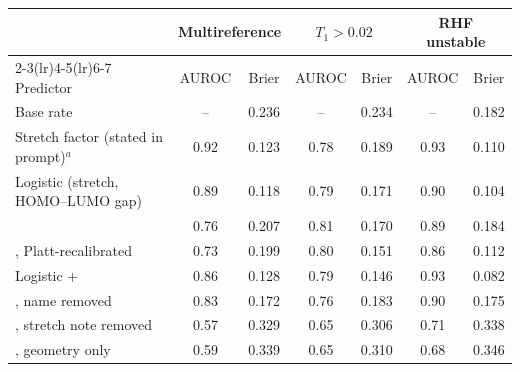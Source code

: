 \begin{tabular}{lcccccc}
\toprule
& \multicolumn{2}{c}{Multireference} & \multicolumn{2}{c}{$T_1>0.02$} & \multicolumn{2}{c}{RHF unstable} \\
\cmidrule(lr){2-3}\cmidrule(lr){4-5}\cmidrule(lr){6-7}
Predictor & AUROC & Brier & AUROC & Brier & AUROC & Brier \\
\midrule
Base rate & -- & 0.236 & -- & 0.234 & -- & 0.182 \\
Stretch factor (stated in prompt)$^a$ & 0.92 & 0.123 & 0.78 & 0.189 & 0.93 & 0.110 \\
Logistic (stretch, HOMO--LUMO gap) & 0.89 & 0.118 & 0.79 & 0.171 & 0.90 & 0.104 \\
\addlinespace
\jev{} & 0.76 & 0.207 & 0.81 & 0.170 & 0.89 & 0.184 \\
\jev{}, Platt-recalibrated & 0.73 & 0.199 & 0.80 & 0.151 & 0.86 & 0.112 \\
Logistic + \jev{} & 0.86 & 0.128 & 0.79 & 0.146 & 0.93 & 0.082 \\
\addlinespace
\jev{}, name removed & 0.83 & 0.172 & 0.76 & 0.183 & 0.90 & 0.175 \\
\jev{}, stretch note removed & 0.57 & 0.329 & 0.65 & 0.306 & 0.71 & 0.338 \\
\jev{}, geometry only & 0.59 & 0.339 & 0.65 & 0.310 & 0.68 & 0.346 \\
\bottomrule
\end{tabular}
